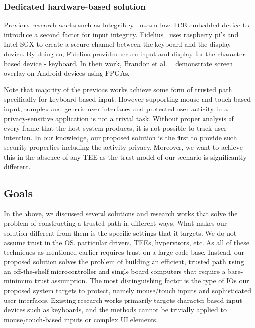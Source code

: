 \subsubsection{Dedicated hardware-based solution} Previous research works such as IntegriKey~\cite{IntegriKey} uses a low-TCB embedded device to introduce a second factor for input integrity. Fidelius~\cite{Fidelius} uses raspberry pi's and Intel SGX to create a secure channel between the keyboard and the display device. By doing so, Fidelius provides secure input and display for the character-based device - keyboard. In their work, Brandon et al. ~\cite{brandon2017trusted} demonstrate screen overlay on Android devices using FPGAs.

Note that majority of the previous works achieve some form of trusted path specifically for keyboard-based input. However supporting mouse and touch-based input, complex and generic user interfaces and protected user activity in a privacy-sensitive application is not a trivial task. Without proper analysis of every frame that the host system produces, it is not possible to track user intention. In our knowledge, our proposed solution is the first to provide such security properties including the activity privacy. Moreover, we want to achieve this in the absence of any TEE as the trust model of our scenario is significantly different. 



\subsection{Goals}

In the above, we discussed several solutions and research works that solve the problem of constructing a trusted path in different ways. What makes our solution different from them is the specific settings that it targets. We do not assume trust in the OS, particular drivers, TEEs, hypervisors, etc. As all of these techniques as mentioned earlier requires trust on a large code base. Instead, our proposed solution solves the problem of building an efficient, trusted path using an off-the-shelf microcontroller and single board computers that require a bare-minimum trust assumption. The most distinguishing factor is the type of IOs our proposed system targets to protect, namely mouse/touch inputs and sophisticated user interfaces. Existing research works primarily targets character-based input devices such as keyboards, and the methods cannot be trivially applied to mouse/touch-based inputs or complex UI elements. 

